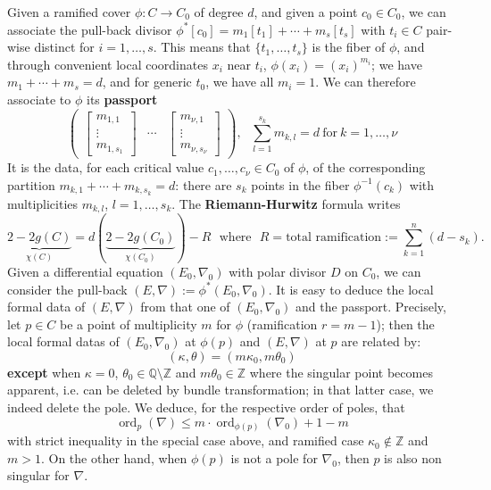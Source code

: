 \documentclass[12]{amsart}
\DeclareMathOperator{\ord}{ord}
\begin{document}
Given a ramified cover $\phi:C\to C_0$ of degree $d$, and given a point $c_0\in C_0$, we can associate 
the pull-back divisor $\phi^*[c_0]=m_1[t_1]+\cdots+m_s[t_s]$ with $t_i\in C$ pair-wise distinct for $i=1,\ldots,s$.
This means that $\{t_1,\ldots,t_s\}$ is the fiber of $\phi$, and through convenient local coordinates $x_i$ near $t_i$, 
$\phi(x_i)=(x_i)^{m_i}$; we have $m_1+\cdots+m_s=d$, and for generic $t_0$, we have all $m_i=1$. 
We can therefore associate to $\phi$ its {\bf passport}
\begin{equation}\label{eq:passport}
\begin{pmatrix}\left[\begin{matrix}m_{1,1}\\ \vdots\\ m_{1,s_1}\end{matrix}\right] & \cdots &
\left[\begin{matrix}m_{\nu,1}\\ \vdots\\ m_{\nu,s_\nu}\end{matrix}\right]\end{pmatrix},\ \ \ \sum_{l=1}^{s_k}m_{k,l}=d\ \text{for}\ k=1,\ldots,\nu
\end{equation}
It is the data, for each critical value $c_1,\ldots,c_\nu\in C_0$ of $\phi$, of the corresponding partition
$m_{k,1}+\cdots+m_{k,s_k}=d$: there are $s_k$ points in the fiber $\phi^{-1}(c_k)$ with multiplicities $m_{k,l}$, $l=1,\ldots,s_k$.
The {\bf Riemann-Hurwitz} formula writes
\begin{equation}\label{eq:RiemHurw}
\underbrace{2-2g(C)}_{\chi(C)}=d(\underbrace{2-2g(C_0)}_{\chi(C_0)})-R\ \ \ \text{where}\ \ \ R=\text{total ramification}:=
\sum_{k=1}^n(d-s_k).
\end{equation}
Given a differential equation $(E_0,\nabla_0)$ with polar divisor $D$ on $C_0$, we can consider the pull-back
$(E,\nabla):=\phi^*(E_0,\nabla_0)$. It is easy to deduce the local formal data of $(E,\nabla)$ from that one
of $(E_0,\nabla_0)$ and the passport. Precisely, let $p\in C$ be a point of multiplicity $m$ for  $\phi$ (ramification $r=m-1$);
then the local formal datas of $(E_0,\nabla_0)$ at $\phi(p)$ and $(E,\nabla)$ at $p$ are related by:
$$(\kappa,\theta)=(m\kappa_0,m\theta_0)$$
{\bf except} when $\kappa=0$, $\theta_0\in\mathbb Q\setminus\mathbb Z$ and $m\theta_0\in\mathbb Z$ 
where the singular point becomes apparent, i.e. can be deleted by bundle transformation; in that latter case,
we indeed delete the pole. We deduce, for the respective order of poles, that 
$$\ord_p(\nabla)\le m\cdot \ord_{\phi(p)}(\nabla_0)+1-m$$
with strict inequality in the special case above, and ramified case $\kappa_0\not\in\mathbb Z$ and $m>1$.
On the other hand, when $\phi(p)$ is not a pole for $\nabla_0$, then $p$ is also non singular for $\nabla$.
\end{document}
